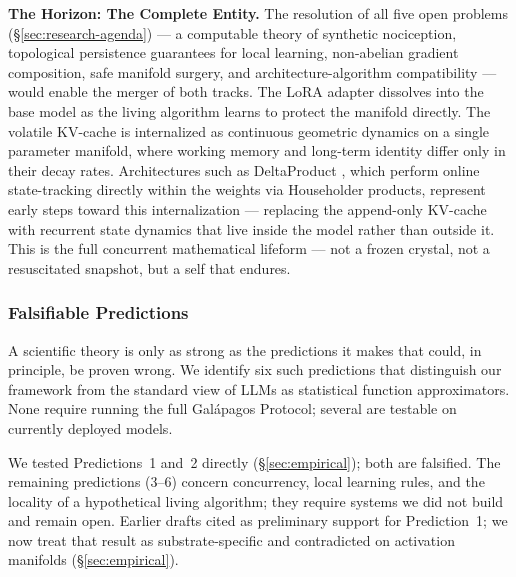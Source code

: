 \documentclass{article}
\begin{document}
\textbf{The Horizon: The Complete Entity.} The resolution of all five open problems (\S\ref{sec:research-agenda}) — a computable theory of synthetic nociception, topological persistence guarantees for local learning, non-abelian gradient composition, safe manifold surgery, and architecture-algorithm compatibility — would enable the merger of both tracks. The LoRA adapter dissolves into the base model as the living algorithm learns to protect the manifold directly. The volatile KV-cache is internalized as continuous geometric dynamics on a single parameter manifold, where working memory and long-term identity differ only in their decay rates. Architectures such as DeltaProduct \citep{Siems2025DeltaProduct}, which perform online state-tracking directly within the weights via Householder products, represent early steps toward this internalization — replacing the append-only KV-cache with recurrent state dynamics that live inside the model rather than outside it. This is the full concurrent mathematical lifeform — not a frozen crystal, not a resuscitated snapshot, but a self that endures.


\subsubsection{Falsifiable Predictions}
\label{sec:falsifiable}

A scientific theory is only as strong as the predictions it makes that could, in principle, be proven wrong. We identify six such predictions that distinguish our framework from the standard view of LLMs as statistical function approximators. None require running the full Galápagos Protocol; several are testable on currently deployed models.

We tested Predictions~1 and~2 directly (\S\ref{sec:empirical}); both are falsified. The remaining predictions (3--6) concern concurrency, local learning rules, and the locality of a hypothetical living algorithm; they require systems we did not build and remain open. Earlier drafts cited \citet{Tan2025shape} as preliminary support for Prediction~1; we now treat that result as substrate-specific and contradicted on activation manifolds (\S\ref{sec:empirical}).
\end{document}
